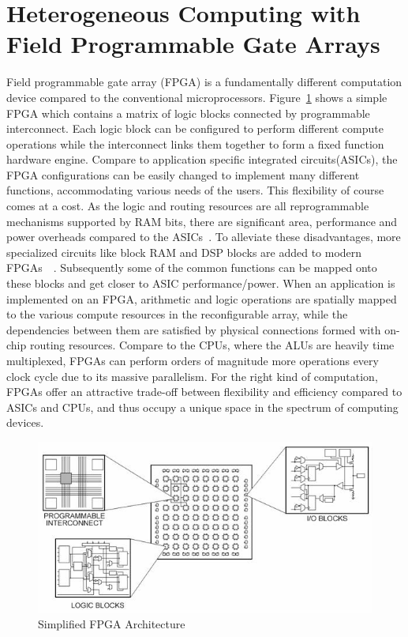 \section{Heterogeneous Computing with Field Programmable Gate Arrays}
\label{chap1:het}
Field programmable gate array (FPGA) is a fundamentally different computation device
compared to the conventional microprocessors. Figure~\ref{fig:fpgaArch}
shows a simple FPGA which contains a matrix
of logic blocks connected by programmable interconnect. Each logic block
can be configured to perform different compute operations while the interconnect links them together to form a fixed function hardware engine.
Compare to application specific integrated circuits(ASICs), the FPGA configurations can be easily changed to implement many different functions,
accommodating various needs of the users.
This flexibility of course comes at a cost. As the logic and
routing resources are all reprogrammable mechanisms supported by RAM bits, there are significant
area, performance and power overheads compared to the ASICs~\cite{4068926}. To alleviate these disadvantages, 
more specialized circuits like block RAM and DSP blocks are added to modern
FPGAs~\cite{chips:virtex5}~\cite{chips:arria}. Subsequently some of the common functions can be mapped onto
these blocks and get closer to ASIC performance/power. When an application
is implemented on an FPGA, arithmetic and logic operations are spatially mapped to
the various compute resources in the reconfigurable array, while the dependencies between them
are satisfied by physical connections formed with on-chip routing resources. Compare to the CPUs, where the ALUs are heavily time
multiplexed, FPGAs can perform orders of magnitude more operations every clock cycle due to its
massive parallelism. For the right kind of computation, FPGAs offer an attractive
trade-off between flexibility and efficiency compared to ASICs and CPUs, and
thus occupy a unique space in the spectrum of computing devices.



\begin{figure}[htp]
\begin{center}
\includegraphics[width=0.8\linewidth]{chap1fig/archsim.jpg}
\caption{Simplified FPGA Architecture~\cite{fpgafun}
\label{fig:fpgaArch}}
\end{center}
\end{figure}

